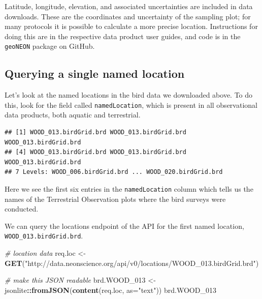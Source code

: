 \documentclass[]{book}
\newenvironment{Shaded}{\begin{snugshade}}{\end{snugshade}}
\newcommand{\CommentTok}[1]{\textcolor[rgb]{0.56,0.35,0.01}{\textit{#1}}}
\newcommand{\DataTypeTok}[1]{\textcolor[rgb]{0.13,0.29,0.53}{#1}}
\newcommand{\DecValTok}[1]{\textcolor[rgb]{0.00,0.00,0.81}{#1}}
\newcommand{\KeywordTok}[1]{\textcolor[rgb]{0.13,0.29,0.53}{\textbf{#1}}}
\newcommand{\NormalTok}[1]{#1}
\newcommand{\OperatorTok}[1]{\textcolor[rgb]{0.81,0.36,0.00}{\textbf{#1}}}
\newcommand{\StringTok}[1]{\textcolor[rgb]{0.31,0.60,0.02}{#1}}
\begin{document}
Latitude, longitude, elevation, and associated uncertainties are included in
data downloads. These are the coordinates and uncertainty of the sampling plot;
for many protocols it is possible to calculate a more precise location.
Instructions for doing this are in the respective data product user guides, and
code is in the \texttt{geoNEON} package on GitHub.

\hypertarget{querying-a-single-named-location}{%
\subsection{Querying a single named location}\label{querying-a-single-named-location}}

Let's look at the named locations in the bird data we downloaded above. To do this,
look for the field called \texttt{namedLocation}, which is present in all observational
data products, both aquatic and terrestrial.

\begin{Shaded}
\end{Shaded}

\begin{verbatim}
## [1] WOOD_013.birdGrid.brd WOOD_013.birdGrid.brd WOOD_013.birdGrid.brd
## [4] WOOD_013.birdGrid.brd WOOD_013.birdGrid.brd WOOD_013.birdGrid.brd
## 7 Levels: WOOD_006.birdGrid.brd ... WOOD_020.birdGrid.brd
\end{verbatim}

Here we see the first six entries in the \texttt{namedLocation} column which tells us
the names of the Terrestrial Observation plots where the bird surveys were
conducted.

We can query the locations endpoint of the API for the first named location,
\texttt{WOOD\_013.birdGrid.brd}.

\begin{Shaded}
\begin{Highlighting}[]
\CommentTok{# location data }
\NormalTok{req.loc <-}\StringTok{ }\KeywordTok{GET}\NormalTok{(}\StringTok{"http://data.neonscience.org/api/v0/locations/WOOD_013.birdGrid.brd"}\NormalTok{)}

\CommentTok{# make this JSON readable}
\NormalTok{brd.WOOD_}\DecValTok{013}\NormalTok{ <-}\StringTok{ }\NormalTok{jsonlite}\OperatorTok{::}\KeywordTok{fromJSON}\NormalTok{(}\KeywordTok{content}\NormalTok{(req.loc, }\DataTypeTok{as=}\StringTok{"text"}\NormalTok{))}
\NormalTok{brd.WOOD_}\DecValTok{013}
\end{Highlighting}
\end{Shaded}
\end{document}
